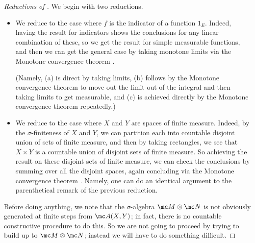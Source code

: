\documentclass[../notes.tex]{subfiles}
\begin{document}
\begin{proof}[Reductions of ]
	We begin with two reductions.
	\begin{itemize}
		\item We reduce to the case where $f$ is the indicator of a function $1_E$. Indeed, having the result for indicators shows the conclusions for any linear combination of these, so we get the result for simple measurable functions, and then we can get the general case by taking monotone limits via the Monotone convergence theorem \cite[Theorem~9.18]{elber-top}.
		
		(Namely, (a) is direct by taking limits, (b) follows by the Monotone convergence theorem to move out the limit out of the integral and then taking limits to get measurable, and (c) is achieved directly by the Monotone convergence theorem repeatedly.)

		\item We reduce to the case where $X$ and $Y$ are spaces of finite measure. Indeed, by the $\sigma$-finiteness of $X$ and $Y$, we can partition each into countable disjoint union of sets of finite measure, and then by taking rectangles, we see that $X\times Y$ is a countable union of disjoint sets of finite measure. So achieving the result on these disjoint sets of finite measure, we can check the conclusions by summing over all the disjoint spaces, again concluding via the Monotone convergence theorem \cite[Theorem~9.18]{elber-top}. Namely, one can do an identical argument to the parenthetical remark of the previous reduction.
	\end{itemize}
	Before doing anything, we note that the $\sigma$-algebra $\mc M\otimes\mc N$ is not obviously generated at finite steps from $\mc A(X,Y)$; in fact, there is no countable constructive procedure to do this. So we are not going to proceed by trying to build up to $\mc M\otimes\mc N$; instead we will have to do something difficult.
\end{proof}
\end{document}
